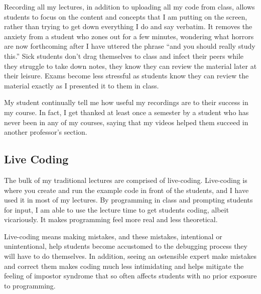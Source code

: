\documentclass[10pt]{article}
\begin{document}
Recording all my lectures, in addition to uploading all my code from class, allows students to focus on the content and concepts that I am putting on the screen, rather than trying to get down everything I do and say verbatim.
It removes the anxiety from a student who zones out for a few minutes, wondering what horrors are now forthcoming after I have uttered the phrase ``and you should really study this.''
Sick students don't drag themselves to class and infect their peers while they struggle to take down notes, they know they can review the material later at their leisure.
Exams become less stressful as students know they can review the material exactly as I presented it to them in class.

My student continually tell me how useful my recordings are to their success in my course.  In fact, I get thanked at least once a semester by a student who has never been in any of my courses, saying that my videos helped them succeed in another professor's section.




\subsection{Live Coding}
The bulk of my traditional lectures are comprised of live-coding.
Live-coding is where you create and run the example code in front of the students, and I have used it in most of my lectures.
By programming in class and prompting students for input, I am able to use the lecture time to get students coding, albeit vicariously.
It makes programming feel more real and less theoretical.

Live-coding means making mistakes, and these mistakes, intentional or unintentional, help students become accustomed to the debugging process they will have to do themselves.
In addition, seeing an ostensible expert make mistakes and correct them makes coding much less intimidating and helps mitigate the feeling of impostor syndrome that so often affects students with no prior exposure to programming.
%
\end{document}
